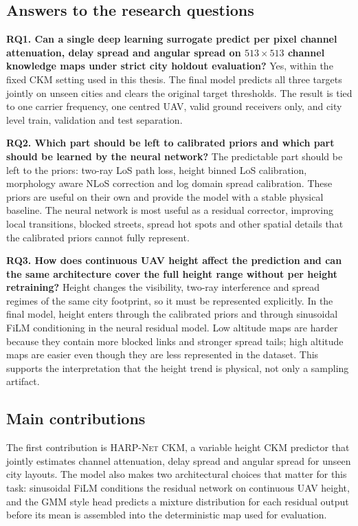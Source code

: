\subsection{Answers to the research questions}

\textbf{RQ1. Can a single deep learning surrogate predict per pixel channel
attenuation, delay spread and angular spread on \(513\times513\) channel
knowledge maps under strict city holdout evaluation?} Yes, within the fixed CKM
setting used in this thesis. The final model predicts all three targets
jointly on unseen cities and clears the original target thresholds. The result
is tied to one carrier frequency, one centred UAV, valid ground receivers only,
and city level train, validation and test separation.

\textbf{RQ2. Which part should be left to calibrated priors and which part
should be learned by the neural network?} The predictable part should be left to
the priors: two-ray LoS path loss, height binned LoS calibration, morphology
aware NLoS correction and log domain spread calibration. These priors are
useful on their own and provide the model with a stable physical baseline. The
neural network is most useful as a residual corrector, improving local
transitions, blocked streets, spread hot spots and other spatial details that
the calibrated priors cannot fully represent.

\textbf{RQ3. How does continuous UAV height affect the prediction and can the
same architecture cover the full height range without per height retraining?}
Height changes the visibility, two-ray interference and spread regimes of the
same city footprint, so it must be represented explicitly. In the final model,
height enters through the calibrated priors and through sinusoidal FiLM
conditioning in the neural residual model. Low altitude maps are harder because
they contain more blocked links and stronger spread tails; high altitude maps
are easier even though they are less represented in the dataset. This supports
the interpretation that the height trend is physical, not only a sampling
artifact.

\subsection{Main contributions}

The first contribution is \textsc{HARP-Net CKM}, a variable height CKM
predictor that jointly estimates channel attenuation, delay spread and angular
spread for unseen city layouts. The model also makes two architectural choices
that matter for this task: sinusoidal FiLM conditions the residual network on
continuous UAV height, and the GMM style head predicts a mixture distribution
for each residual output before its mean is assembled into the deterministic
map used for evaluation.


